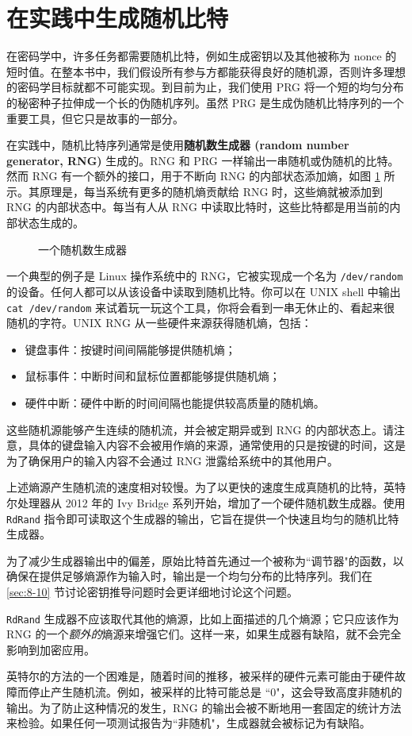 \section{在实践中生成随机比特}

在密码学中，许多任务都需要随机比特，例如生成密钥以及其他被称为 nonce 的短时值。在整本书中，我们假设所有参与方都能获得良好的随机源，否则许多理想的密码学目标就都不可能实现。到目前为止，我们使用 PRG 将一个短的均匀分布的秘密种子拉伸成一个长的伪随机序列。虽然 PRG 是生成伪随机比特序列的一个重要工具，但它只是故事的一部分。

在实践中，随机比特序列通常是使用\textbf{随机数生成器 (random number generator, RNG)} 生成的。RNG 和 PRG 一样输出一串随机或伪随机的比特。然而 RNG 有一个额外的接口，用于不断向 RNG 的内部状态添加熵，如图 \ref{fig:3-14} 所示。其原理是，每当系统有更多的随机熵贡献给 RNG 时，这些熵就被添加到 RNG 的内部状态中。每当有人从 RNG 中读取比特时，这些比特都是用当前的内部状态生成的。

\begin{figure}
	\centering
	
	\caption{一个随机数生成器}
	\label{fig:3-14}
\end{figure}

一个典型的例子是 Linux 操作系统中的 RNG，它被实现成一个名为 \texttt{/dev/random} 的设备。任何人都可以从该设备中读取到随机比特。你可以在 UNIX shell 中输出 \texttt{cat /dev/random} 来试着玩一玩这个工具，你将会看到一串无休止的、看起来很随机的字符。UNIX RNG 从一些硬件来源获得随机熵，包括：
\begin{itemize}
	\item 键盘事件：按键时间间隔能够提供随机熵；
	\item 鼠标事件：中断时间和鼠标位置都能够提供随机熵；
	\item 硬件中断：硬件中断的时间间隔也能提供较高质量的随机熵。
\end{itemize}
这些随机源能够产生连续的随机流，并会被定期异或到 RNG 的内部状态上。请注意，具体的键盘输入内容不会被用作熵的来源，通常使用的只是按键的时间，这是为了确保用户的输入内容不会通过 RNG 泄露给系统中的其他用户。

\begin{snote}[高熵随机生成。]
上述熵源产生随机流的速度相对较慢。为了以更快的速度生成真随机的比特，英特尔处理器从 2012 年的 Ivy Bridge 系列开始，增加了一个硬件随机数生成器。使用 \texttt{RdRand} 指令即可读取这个生成器的输出，它旨在提供一个快速且均匀的随机比特生成器。

为了减少生成器输出中的偏差，原始比特首先通过一个被称为``调节器"的函数，以确保在提供足够熵源作为输入时，输出是一个均匀分布的比特序列。我们在 \ref{sec:8-10} 节讨论密钥推导问题时会更详细地讨论这个问题。

\texttt{RdRand} 生成器不应该取代其他的熵源，比如上面描述的几个熵源；它只应该作为 RNG 的一个\emph{额外的}熵源来增强它们。这样一来，如果生成器有缺陷，就不会完全影响到加密应用。

英特尔的方法的一个困难是，随着时间的推移，被采样的硬件元素可能由于硬件故障而停止产生随机流。例如，被采样的比特可能总是 ``$0$"，这会导致高度非随机的输出。为了防止这种情况的发生，RNG 的输出会被不断地用一套固定的统计方法来检验。如果任何一项测试报告为``非随机"，生成器就会被标记为有缺陷。
\end{snote}